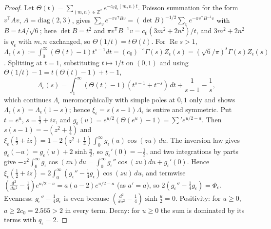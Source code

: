 \documentclass[11pt]{article}
\theoremstyle{definition}\newtheorem{definition}[theorem]{Definition}
\theoremstyle{remark}\newtheorem{remark}[theorem]{Remark}
\renewcommand{\Re}{\operatorname{Re}}\renewcommand{\Im}{\operatorname{Im}}
\begin{document}
\begin{proof}
Let $\Theta(t)=\sum_{(m,n)\in\mathbb Z^2}e^{-c_0q_\epsilon(m,n)t}$. Poisson summation for the form $v^{\mathsf T}Av$, $A=\mathrm{diag}(2,3)$, gives $\sum_ve^{-\pi v^{\mathsf T}Bv}=(\det B)^{-1/2}\sum_ve^{-\pi v^{\mathsf T}B^{-1}v}$ with $B=tA/\sqrt6$; here $\det B=t^2$ and $\pi v^{\mathsf T}B^{-1}v=c_0(3m^2+2n^2)/t$, and $3m^2+2n^2$ is $q_\epsilon$ with $m,n$ exchanged, so $\Theta(1/t)=t\,\Theta(t)$. For $\Re s>1$, $\Lambda_\epsilon(s):=\int_0^\infty(\Theta(t)-1)t^{s-1}dt=(c_0)^{-s}\Gamma(s)Z_\epsilon(s)=(\sqrt6/\pi)^s\Gamma(s)Z_\epsilon(s)$. Splitting at $t=1$, substituting $t\mapsto1/t$ on $(0,1)$ and using $\Theta(1/t)-1=t(\Theta(t)-1)+t-1$,
\[
\Lambda_\epsilon(s)=\int_1^\infty(\Theta(t)-1)(t^{s-1}+t^{-s})\,dt+\frac1{s-1}-\frac1s ,
\]
which continues $\Lambda_\epsilon$ meromorphically with simple poles at $0,1$ only and shows $\Lambda_\epsilon(s)=\Lambda_\epsilon(1-s)$; hence $\xi_\epsilon=s(s-1)\Lambda_\epsilon$ is entire and symmetric. Put $t=e^u$, $s=\frac12+iz$, and $g_\epsilon(u)=e^{u/2}(\Theta(e^u)-1)=\sum'e^{u/2-a}$. Then $s(s-1)=-(z^2+\frac14)$ and $\xi_\epsilon(\frac12+iz)=1-2(z^2+\frac14)\int_0^\infty g_\epsilon(u)\cos(zu)\,du$. The inversion law gives $g_\epsilon(-u)=g_\epsilon(u)+2\sinh\frac u2$, so $g_\epsilon'(0)=-\frac12$, and two integrations by parts give $-z^2\int_0^\infty g_\epsilon\cos(zu)du=\int_0^\infty g_\epsilon''\cos(zu)du+g_\epsilon'(0)$. Hence $\xi_\epsilon(\frac12+iz)=2\int_0^\infty(g_\epsilon''-\frac14g_\epsilon)\cos(zu)\,du$, and termwise $(\frac{d^2}{du^2}-\frac14)e^{u/2-a}=a(a-2)e^{u/2-a}$ (as $a'=a$), so $2(g_\epsilon''-\frac14g_\epsilon)=\Phi_\epsilon$. Evenness: $g_\epsilon''-\frac14g_\epsilon$ is even because $(\frac{d^2}{du^2}-\frac14)\sinh\frac u2=0$. Positivity: for $u\ge0$, $a\ge2c_0=2.565>2$ in every term. Decay: for $u\ge0$ the sum is dominated by its terms with $q_\epsilon=2$.
\end{proof}
\end{document}
